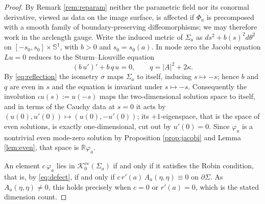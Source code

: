 \documentclass[11pt,a4paper]{amsart}
\theoremstyle{plain}
\theoremstyle{definition}
\newcommand{\R}{\mathbb{R}}
\newcommand{\Sph}{\mathbb{S}}
\newcommand{\Ker}{\mathcal{K}}
\begin{document}
\begin{proof}
By Remark \ref{rem:reparam} neither the parametric field nor its conormal derivative, viewed as data on the image surface, is affected if $\Phi_a$ is precomposed with a smooth family of boundary-preserving diffeomorphisms; we may therefore work in the arclength gauge. Write the induced metric of $\Sigma_a$ as $ds^2+b(s)^2d\theta^2$ on $[-s_0,s_0]\times\Sph^1$, with $b>0$ and $s_0=s_0(a)$. In mode zero the Jacobi equation $Lu=0$ reduces to the Sturm--Liouville equation
\[
(b\,u')'+b\,q\,u=0,\qquad q=|A|^2+2\kappa .
\]
By \eqref{eq:reflection} the isometry $\sigma$ maps $\Sigma_a$ to itself, inducing $s\mapsto-s$; hence $b$ and $q$ are even in $s$ and the equation is invariant under $s\mapsto-s$. Consequently the involution $\iota u(s):=u(-s)$ maps the two-dimensional solution space to itself, and in terms of the Cauchy data at $s=0$ it acts by $(u(0),u'(0))\mapsto(u(0),-u'(0))$; its $+1$-eigenspace, that is the space of even solutions, is exactly one-dimensional, cut out by $u'(0)=0$. Since $\varphi_a$ is a nontrivial even mode-zero solution by Proposition \ref{prop:jacobi} and Lemma \ref{lem:even}, that space is $\R\varphi_a$.

An element $c\,\varphi_a$ lies in $\Ker_0^{\mathrm{ev}}(\Sigma_a)$ if and only if it satisfies the Robin condition, that is, by \eqref{eq:defect}, if and only if $c\,r'(a)\,A_a(\eta,\eta)\equiv 0$ on $\partial\Sigma$. As $A_a(\eta,\eta)\neq 0$, this holds precisely when $c=0$ or $r'(a)=0$, which is the stated dimension count.
\end{proof}
\end{document}
